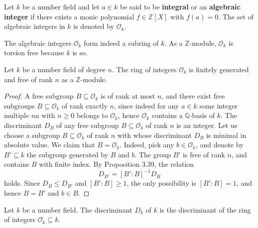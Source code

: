 \documentclass[12pt, a4paper]{article}
\begin{document}
\begin{definition}
    Let \( k \) be a number field and let \( a \in k \) be said to be \textbf{integral} or an \textbf{algebraic integer} if there exists a monic polynomial \( f \in \mathbb{Z}[X] \) with \( f(a) = 0 \). The set of algebraic integers in \( k \) is denoted by \( \mathcal{O}_k \).
\end{definition}

\begin{mdremark}
    The algebraic integers \( \mathcal{O}_k \) form indeed a subring of \( k \). As a \( \mathbb{Z} \)-module, \( \mathcal{O}_k \) is torsion free because \( k \) is so.
\end{mdremark}

\begin{mdthm}
    Let \( k \) be a number field of degree \( n \). The ring of integers \( \mathcal{O}_k \) is finitely generated and free of rank \( n \) as a \( \mathbb{Z} \)-module.
\end{mdthm}

\begin{proof}
    A free subgroup \( B \subseteq \mathcal{O}_k \) is of rank at most \( n \), and there exist free subgroups \( B \subseteq \mathcal{O}_k \) of rank exactly \( n \), since indeed for any \( a \in k \) some integer multiple \( na \) with \( n \geq 0 \) belongs to \( \mathcal{O}_k \), hence \( \mathcal{O}_k \) contains a \( \mathbb{Q} \)-basis of \( k \). The discriminant \( D_B \) of any free subgroup \( B \subseteq \mathcal{O}_k \) of rank \( n \) is an integer. Let us choose a subgroup \( B \subseteq \mathcal{O}_k \) of rank \( n \) with whose discriminant \( D_B \) is minimal in absolute value. We claim that \( B = \mathcal{O}_k \). Indeed, pick any \( b \in \mathcal{O}_k \), and denote by \( B' \subseteq k \) the subgroup generated by \( B \) and \( b \). The group \( B' \) is free of rank \( n \), and contains \( B \) with finite index. By Proposition 3.39, the relation
    \[ D_{B'} = [B' : B]^{-1} D_B \]
    holds. Since \( D_B \leq D_{B'} \) and \( [B' : B] \geq 1 \), the only possibility is \( [B' : B] = 1 \), and hence \( B = B' \) and \( b \in B \). 
\end{proof}

\begin{definition}
     Let \( k \) be a number field. The discriminant \( D_k \) of \( k \) is the discriminant of the ring of integers \( \mathcal{O}_k \subseteq k \).
\end{definition}
\end{document}
